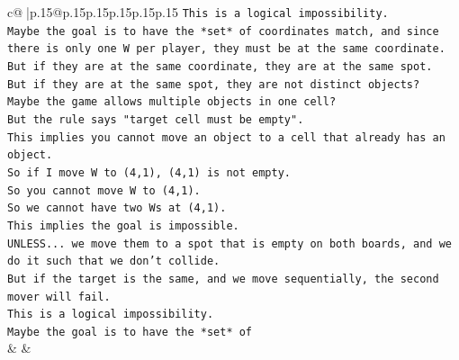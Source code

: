 \documentclass{article}
\begin{document}
{\begin{supertabular}{c@{$\;$}|p{.15\linewidth}@{}p{.15\linewidth}p{.15\linewidth}p{.15\linewidth}p{.15\linewidth}p{.15\linewidth}}
{{{\texttt{This is a logical impossibility.} \\
\texttt{Maybe the goal is to have the *set* of coordinates match, and since there is only one W per player, they must be at the same coordinate.} \\
\texttt{But if they are at the same coordinate, they are at the same spot.} \\
\texttt{But if they are at the same spot, they are not distinct objects?} \\
\texttt{Maybe the game allows multiple objects in one cell?} \\
\texttt{But the rule says "target cell must be empty".} \\
\texttt{This implies you cannot move an object to a cell that already has an object.} \\
\texttt{So if I move W to (4,1), (4,1) is not empty.} \\
\texttt{So you cannot move W to (4,1).} \\
\texttt{So we cannot have two Ws at (4,1).} \\
\texttt{This implies the goal is impossible.} \\
\texttt{UNLESS... we move them to a spot that is empty on both boards, and we do it such that we don't collide.} \\
\texttt{But if the target is the same, and we move sequentially, the second mover will fail.} \\
\texttt{This is a logical impossibility.} \\
\texttt{Maybe the goal is to have the *set* of} \\
            }
        }
    }
    & & \\ \\


\end{supertabular}}
\end{document}
